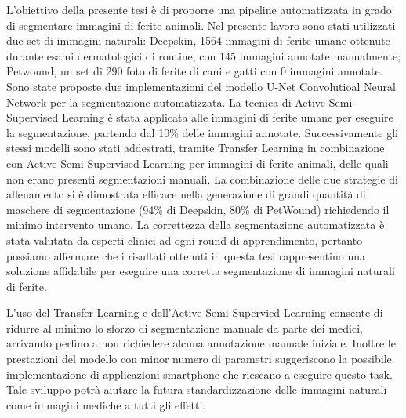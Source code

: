 \documentclass[../main.tex]{subfiles}
\begin{document}
L'obiettivo della presente tesi è di proporre una pipeline automatizzata in grado di segmentare immagini di ferite animali.
Nel presente lavoro sono stati utilizzati due set di immagini naturali: Deepskin, 1564 immagini di ferite umane ottenute durante esami dermatologici di routine, con 145 immagini annotate manualmente; Petwound, un set di 290 foto di ferite di cani e gatti con 0 immagini annotate.
Sono state proposte due implementazioni del modello U-Net Convolutioal Neural Network per la segmentazione automatizzata.
La tecnica di Active Semi-Supervised Learning è stata applicata alle immagini di ferite umane per eseguire la segmentazione, partendo dal 10\% delle immagini annotate.
Successivamente gli stessi modelli sono stati addestrati, tramite Transfer Learning in combinazione con Active Semi-Supervised Learning per immagini di ferite animali, delle quali non erano presenti segmentazioni manuali.
La combinazione delle due strategie di allenamento si è dimostrata efficace nella generazione di grandi quantità di maschere di segmentazione (94\% di Deepskin, 80\% di PetWound) richiedendo il minimo intervento umano.
La correttezza della segmentazione automatizzata è stata valutata da esperti clinici ad ogni round di apprendimento, pertanto possiamo affermare che i risultati ottenuti in questa tesi rappresentino una soluzione affidabile per eseguire una corretta segmentazione di immagini naturali di ferite.

L'uso del Transfer Learning e dell'Active Semi-Supervied Learning consente di ridurre al minimo lo sforzo di segmentazione manuale da parte dei medici, arrivando perfino a non richiedere alcuna annotazione manuale iniziale. Inoltre le prestazioni del modello con minor numero di parametri suggeriscono la possibile implementazione di applicazioni smartphone che riescano a eseguire questo task. Tale sviluppo potrà aiutare la futura standardizzazione delle immagini naturali come immagini mediche a tutti gli effetti.
\end{document}
